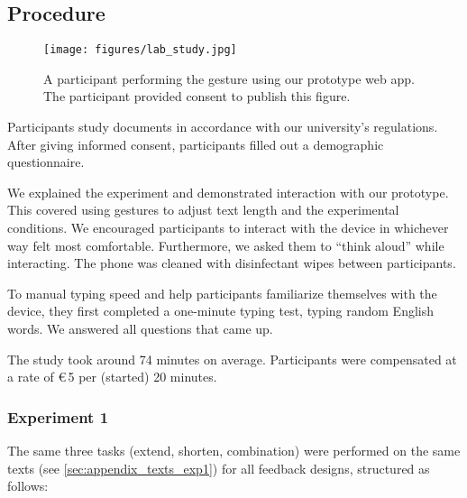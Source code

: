 \subsection{Procedure}

\begin{figure}
    \centering
    \texttt{[image: figures/lab\_study.jpg]}
    \caption{A participant performing the \spread{} gesture using our prototype web app. The participant provided consent to publish this figure.}
    \label{fig:lab_study}
\end{figure}

Participants  study documents in accordance with our university's regulations. %
After giving informed consent, participants filled out a demographic questionnaire.

We explained the experiment and demonstrated interaction with our prototype. 
This covered using gestures to adjust text length and the experimental conditions.
We encouraged participants to interact with the device in whichever way felt most comfortable. %
Furthermore, we asked them to ``think aloud'' while interacting. %
The phone was cleaned with disinfectant wipes between participants.

To  manual typing speed and help participants familiarize themselves with the device, they first completed a one-minute typing test, typing random English words. 
We answered all questions that came up.

The study took around 74 minutes on average.
Participants were compensated at a rate of €\,5 per (started) 20 minutes. %


\subsubsection{Experiment 1} %
\label{sec:procedure_exp1}
The same three tasks (extend, shorten, combination) were performed on the same texts (see \cref{sec:appendix_texts_exp1}) for all feedback designs, structured as follows:

